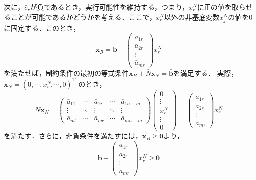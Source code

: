 \documentclass{jsreport}
\begin{document}
次に，$\bar{c}_r$が負であるとき，実行可能性を維持する，つまり，$x_r^N$に正の値を取らせることが可能であるかどうかを考える．ここで，$x_r^N$以外の非基底変数$x_j^N$の値を0に固定する．このとき，
\begin{equation}\label{eq:x_B}
  \bm{x}_B = \bar{\bm{b}} -
  \left(
  \begin{array}{c}
    \bar{a}_{1r} \\
    \bar{a}_{2r} \\
    \vdots \\
    \bar{a}_{mr}
  \end{array}
  \right)x_r^N
\end{equation}
を満たせば，制約条件の最初の等式条件$\bm{x}_B + \bar{N}\bm{x}_N = \bar{\bm{b}}$を満足する．
実際，$\bm{x}_N = \left(0, \cdots, x_r^N, \cdots, 0 \right)^{\mathrm{T}}$
のとき，
\begin{equation}
  \bar{N} \bm{x}_N = \left(
  \begin{array}{ccccc}
    \bar{a}_{11} & \cdots & \bar{a}_{1r} & \cdots & \bar{a}_{1 n-m} \\
    \vdots & \ddots & \vdots & \ddots & \vdots \\
    \bar{a}_{m1} & \cdots & \bar{a}_{mr} & \cdots & \bar{a}_{m n-m}
  \end{array}
  \right) \left(
  \begin{array}{c}
    0 \\
    \vdots \\
    x_r^N \\
    \vdots \\
    0
  \end{array}
  \right) = \left(
  \begin{array}{c}
    \bar{a}_{1r} \\
    \bar{a}_{2r} \\
    \vdots \\
    \bar{a}_{mr}
  \end{array}
  \right)x_r^N \nonumber
\end{equation}
を満たす．さらに，非負条件を満たすには，$\bm{x}_B \geq \bm{0}$より，
\begin{equation}\label{eq:notminus}
  \bar{\bm{b}} -
  \left(
  \begin{array}{c}
    \bar{a}_{1r} \\
    \bar{a}_{2r} \\
    \vdots \\
    \bar{a}_{mr}
  \end{array}
  \right)x_r^N \geq \bm{0}
\end{equation}
\end{document}
